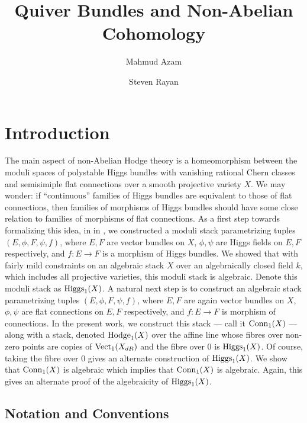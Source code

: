 \documentclass[11pt]{amsart}
\title[Quiver Bundles and Non-Abelian Cohomology]
      {Quiver Bundles and Non-Abelian Cohomology}
\author{Mahmud Azam}
\author{Steven Rayan}
\begin{document}
\begin{abstract}
\end{abstract}

\maketitle

\tableofcontents

\section{Introduction}

The main aspect of non-Abelian Hodge theory
is a homeomorphism between the moduli spaces of polystable Higgs bundles
with vanishing rational Chern classes and semisimiple flat connections over
a smooth projective variety $X$. We may wonder:
if ``continuous'' families of Higgs bundles are equivalent to those of flat
connections, then families of morphisms of Higgs bundles should have some close
relation to families of morphisms of flat connections.
As a first step towards formalizing this idea, in \cite{ModQuivBun}
in \cite{ModQuivBun}, we constructed a moduli stack parametrizing tuples
$(E, \phi, F, \psi, f)$, where $E, F$ are vector bundles on $X$,
$\phi, \psi$ are Higgs fields on $E, F$ respectively, and $f : E \to F$
is a morphism of Higgs bundles. We showed that with fairly mild constraints
on an algebraic stack $X$ over an algebraically closed field $k$, which includes
all projective varieties, this moduli stack is algebraic.
Denote this moduli stack as $\mathrm{Higgs}_1(X)$. A natural next step is
to construct an algebraic stack parametrizing tuples $(E, \phi, F, \psi, f)$,
where $E, F$ are again vector bundles on $X$, $\phi, \psi$ are flat connections
on $E, F$ respectively, and $f : E \to F$ is morphism of connections.
In the present work, we construct this stack --- call it $\mathrm{Conn}_1(X)$ ---
along with a stack, denoted $\mathrm{Hodge}_1(X)$ over the affine line whose fibres over
non-zero points are copies of $\mathrm{Vect}_1(X_{dR})$ and the fibre over $0$ is
$\mathrm{Higgs}_1(X)$. Of course, taking the fibre over $0$ gives an alternate
construction of $\mathrm{Higgs}_1(X)$. We show that $\mathrm{Conn}_1(X)$ is algebraic
which implies that $\mathrm{Conn}_1(X)$ is algebraic. Again, this gives an alternate
proof of the algebraicity of $\mathrm{Higgs}_1(X)$.

\subsection{Notation and Conventions}
\end{document}
